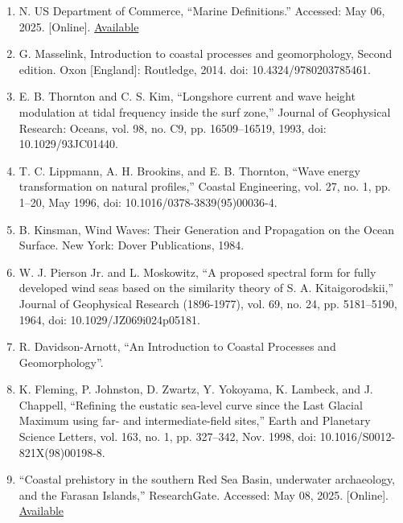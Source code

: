 \documentclass{article}
\begin{document}
\begin{enumerate}
    \item {N. US Department of Commerce, “Marine Definitions.” Accessed: May 06, 2025. [Online]. \href{https://www.weather.gov/gum/MarineDefinitions}{Available}}

    \item {G. Masselink, Introduction to coastal processes and geomorphology, Second edition. Oxon [England]: Routledge, 2014. doi: 10.4324/9780203785461.}

    \item {E. B. Thornton and C. S. Kim, “Longshore current and wave height modulation at tidal frequency inside the surf zone,” Journal of Geophysical Research: Oceans, vol. 98, no. C9, pp. 16509–16519, 1993, doi: 10.1029/93JC01440.}

    \item {T. C. Lippmann, A. H. Brookins, and E. B. Thornton, “Wave energy transformation on natural profiles,” Coastal Engineering, vol. 27, no. 1, pp. 1–20, May 1996, doi: 10.1016/0378-3839(95)00036-4.}

    \item {B. Kinsman, Wind Waves: Their Generation and Propagation on the Ocean Surface. New York: Dover Publications, 1984.}

    \item {W. J. Pierson Jr. and L. Moskowitz, “A proposed spectral form for fully developed wind seas based on the similarity theory of S. A. Kitaigorodskii,” Journal of Geophysical Research (1896-1977), vol. 69, no. 24, pp. 5181–5190, 1964, doi: 10.1029/JZ069i024p05181.}

    \item {R. Davidson-Arnott, “An Introduction to Coastal Processes and Geomorphology”.}

    \item {K. Fleming, P. Johnston, D. Zwartz, Y. Yokoyama, K. Lambeck, and J. Chappell, “Refining the eustatic sea-level curve since the Last Glacial Maximum using far- and intermediate-field sites,” Earth and Planetary Science Letters, vol. 163, no. 1, pp. 327–342, Nov. 1998, doi: 10.1016/S0012-821X(98)00198-8.}

    \item {“Coastal prehistory in the southern Red Sea Basin, underwater archaeology, and the Farasan Islands,” ResearchGate. Accessed: May 08, 2025. [Online]. \href{https://www.researchgate.net/publication/277182725_Coastal_prehistory_in_the_southern_Red_Sea_Basin_underwater_archaeology_and_the_Farasan_Islands}{Available}}


\end{enumerate}
\end{document}

